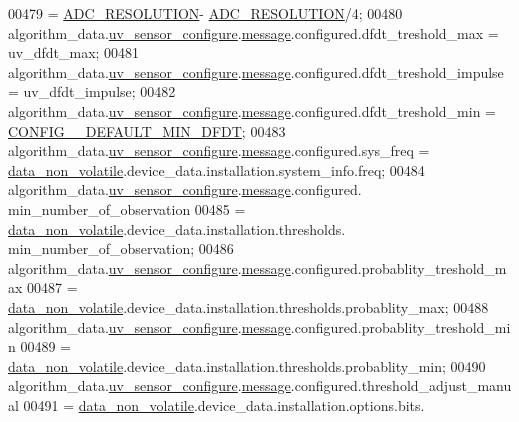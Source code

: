 \begin{DoxyCode}
{{{{{00479                                           = \hyperlink{a00058_a00978ca9e8220475258dcbbbb7d29129}{ADC\_RESOLUTION}- 
      \hyperlink{a00058_a00978ca9e8220475258dcbbbb7d29129}{ADC\_RESOLUTION}/4;
00480     algorithm\_data.\hyperlink{a00016_af1ff980a38b896c99e86279a3c67f00d}{uv\_sensor\_configure}.\hyperlink{a00018_a32952acc732e2f16aad59fe0804da5bf}{message}.configured.dfdt\_treshold\_max      
         = uv\_dfdt\_max;
00481     algorithm\_data.\hyperlink{a00016_af1ff980a38b896c99e86279a3c67f00d}{uv\_sensor\_configure}.\hyperlink{a00018_a32952acc732e2f16aad59fe0804da5bf}{message}.configured.dfdt\_treshold\_impulse  
         = uv\_dfdt\_impulse;
00482     algorithm\_data.\hyperlink{a00016_af1ff980a38b896c99e86279a3c67f00d}{uv\_sensor\_configure}.\hyperlink{a00018_a32952acc732e2f16aad59fe0804da5bf}{message}.configured.dfdt\_treshold\_min      
         = \hyperlink{a00021_a0eae7c540b766617bb00f79cd63415a2}{CONFIG\_\_DEFAULT\_MIN\_DFDT};
00483     algorithm\_data.\hyperlink{a00016_af1ff980a38b896c99e86279a3c67f00d}{uv\_sensor\_configure}.\hyperlink{a00018_a32952acc732e2f16aad59fe0804da5bf}{message}.configured.sys\_freq               
         = \hyperlink{a00060_a76ac5f917f5308dcd83de0d7c94559fb}{data\_non\_volatile}.device\_data.installation.system\_info.freq;
00484     algorithm\_data.\hyperlink{a00016_af1ff980a38b896c99e86279a3c67f00d}{uv\_sensor\_configure}.\hyperlink{a00018_a32952acc732e2f16aad59fe0804da5bf}{message}.configured.
      min\_number\_of\_observation
00485                    = \hyperlink{a00060_a76ac5f917f5308dcd83de0d7c94559fb}{data\_non\_volatile}.device\_data.installation.thresholds.
      min\_number\_of\_observation;
00486     algorithm\_data.\hyperlink{a00016_af1ff980a38b896c99e86279a3c67f00d}{uv\_sensor\_configure}.\hyperlink{a00018_a32952acc732e2f16aad59fe0804da5bf}{message}.configured.probablity\_treshold\_max
00487                    = \hyperlink{a00060_a76ac5f917f5308dcd83de0d7c94559fb}{data\_non\_volatile}.device\_data.installation.thresholds.probablity\_max;
00488     algorithm\_data.\hyperlink{a00016_af1ff980a38b896c99e86279a3c67f00d}{uv\_sensor\_configure}.\hyperlink{a00018_a32952acc732e2f16aad59fe0804da5bf}{message}.configured.probablity\_treshold\_min
00489                    = \hyperlink{a00060_a76ac5f917f5308dcd83de0d7c94559fb}{data\_non\_volatile}.device\_data.installation.thresholds.probablity\_min;
00490     algorithm\_data.\hyperlink{a00016_af1ff980a38b896c99e86279a3c67f00d}{uv\_sensor\_configure}.\hyperlink{a00018_a32952acc732e2f16aad59fe0804da5bf}{message}.configured.threshold\_adjust\_manual
00491                    = \hyperlink{a00060_a76ac5f917f5308dcd83de0d7c94559fb}{data\_non\_volatile}.device\_data.installation.options.bits.
}}}}}
\end{DoxyCode}
